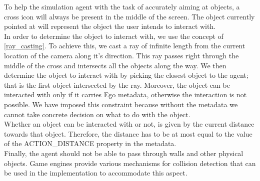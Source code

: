 To help the simulation agent with the task of accurately aiming at objects, a cross icon will always be present in the middle of the screen. The object currently pointed at will represent the object the user intends to interact with.\\

In order to determine the object to interact with, we use the concept of \ref{ray_casting}. To achieve this, we cast a ray of infinite length from the current location of the camera along it's direction. This ray passes right through the middle of the cross and intersects all the objects along the way. We then determine the object to interact with by picking the closest object to the agent; that is the first object intersected by the ray. Moreover, the object can be interacted with only if it carries Ego metadata, otherwise the interaction is not possible. We have imposed this constraint because without the metadata we cannot take concrete decision on what to do with the object.\\

Whether an object can be interacted with or not, is given by the current distance towards that object. Therefore, the distance has to be at most equal to the value of the ACTION\_DISTANCE property in the metadata.\\

Finally, the agent should not be able to pass through walls and other physical objects. Game engines provide various mechanisms for collision detection that can be used in the implementation to accommodate this aspect.\\
